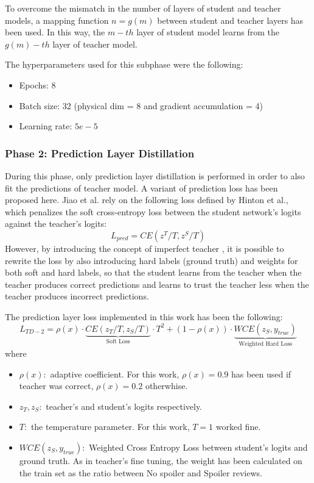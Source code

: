 \documentclass[11pt, a4paper]{article}
\begin{document}
To overcome the mismatch in the number of layers of student and teacher models, a mapping function $n = g(m)$ between student and teacher layers has been used. In this way, the $m-th$ layer of student model learns from the $g(m)-th$ layer of teacher model.

The hyperparameters used for this subphase were the following:
\begin{itemize}
  \item Epochs: 8
  \item Batch size: 32 (physical dim = 8 and gradient accumulation = 4)
  \item Learning rate: $5e-5$
\end{itemize}
\subsubsection{Phase 2: Prediction Layer Distillation}
During this phase, only prediction layer distillation is performed in order to also fit the predictions of teacher model. A variant of prediction loss has been proposed here. Jiao et al. rely on the following loss defined by Hinton et al., which penalizes the soft cross-entropy loss between the student network's logits against the teacher's logits:
\begin{equation}
L_{pred} = CE (z^T/T, z^S/T)
\end{equation}
However, by introducing the concept of imperfect teacher \cite{ji2020knowledgedistillationwideneural}, it is possible to rewrite the loss by also introducing hard labels (ground truth) and weights for both soft and hard labels, so that the student learns from the teacher when the teacher produces correct predictions and learns to trust the teacher less when the teacher produces incorrect predictions.

The prediction layer loss implemented in this work has been the following:
\begin{equation}
  L_{TD-2} = \rho(x) \cdot \underbrace{CE(z_T/T, z_S/T)}_{\text{Soft Loss}} \cdot T^2 + (1 - \rho(x)) \cdot \underbrace{WCE(z_S, y_{true})}_{\text{Weighted Hard Loss}}
\end{equation}
where 
\begin{itemize}
\item $\rho(x):$ adaptive coefficient. For this work, $\rho(x) = 0.9$ has been used if teacher was correct, $\rho(x) = 0.2$ otherwhise.
\item $z_T, z_S:$ teacher's and student's logits respectively.
\item $T:$ the temperature parameter. For this work, $T=1$ worked fine.
\item $WCE(z_S, y_{true}):$ Weighted Cross Entropy Loss between student's logits and ground truth. As in teacher's fine tuning, the weight has been calculated on the train set as the ratio between No spoiler and Spoiler reviews.
\end{itemize}
\end{document}
